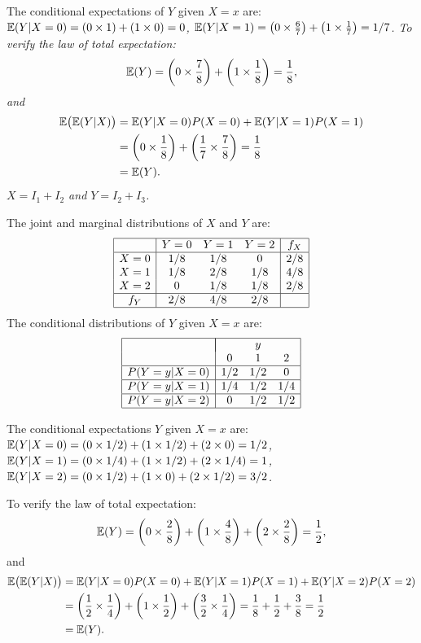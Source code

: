 \begin{exercise}
\begin{questions}
\begin{answer}
The conditional expectations of $Y$ given $X=x$ are:
\bit
\it $\mathbb{E}(Y|X=0) = \left(0\times 1\right) + \left(1\times 0\right) = 0$,
\it $\mathbb{E}(Y|X=1) = \left(0\times\frac{6}{7}\right) + \left(1\times\frac{1}{7}\right) = 1/7$.
\eit
To verify the law of total expectation:
\[
\mathbb{E}(Y) = \left(0\times\frac{7}{8}\right) + \left(1\times\frac{1}{8}\right) = \frac{1}{8},
\]
and
\begin{align*}
\mathbb{E}\big(\mathbb{E}(Y|X)\big)
	& = \mathbb{E}(Y|X=0)P(X=0)+\mathbb{E}(Y|X=1)P(X=1) \\
	& = \left(0\times \frac{1}{8}\right) + \left(\frac{1}{7}\times\frac{7}{8}\right) = \frac{1}{8} \\
	& = \mathbb{E}(Y).
\end{align*}
\it %
$X = I_1 + I_2$ and $Y = I_2 + I_3$.

The joint and marginal distributions of $X$ and $Y$ are:
\[
\begin{array}{|c|ccc|c|}\hline
	&	Y=0		& Y=1	& Y=2	& f_X \\ \hline
X=0	&	1/8		& 1/8	& 0		& 2/8 \\
X=1	&	1/8		& 2/8	& 1/8 	& 4/8 \\ 
X=2	&	  0		& 1/8 	& 1/8	& 2/8 \\ \hline
f_Y &	2/8		& 4/8	& 2/8	&	  \\ \hline
\end{array}
\]
The conditional distributions of $Y$ given $X=x$ are:
\[
\begin{array}{|c|ccc|}\hline
			&\multicolumn{3}{|c|}{y} 		\\
			&	0		& 1		& 2		\\ \hline
P(Y=y|X=0)	&	1/2		& 1/2 	& 0		\\ \hline
P(Y=y|X=1)	&	1/4		& 1/2 	& 1/4	\\ \hline
P(Y=y|X=2)	&	0		& 1/2 	& 1/2	\\ \hline
\end{array}
\]

The conditional expectations $Y$ given $X=x$ are:
\bit
\it $\mathbb{E}(Y|X=0) = (0\times 1/2)+(1\times 1/2)+(2\times   0) = 1/2$,
\it $\mathbb{E}(Y|X=1) = (0\times 1/4)+(1\times 1/2)+(2\times 1/4) = 1$,
\it $\mathbb{E}(Y|X=2) = (0\times 1/2)+(1\times 0)  +(2\times 1/2) = 3/2$.
\eit

To verify the law of total expectation:
\[
\mathbb{E}(Y) = \left(0\times\frac{2}{8}\right) + \left(1\times\frac{4}{8}\right) + \left(2\times\frac{2}{8}\right) = \frac{1}{2},
\]
and
\begin{align*}
\mathbb{E}\big(\mathbb{E}(Y|X)\big)
	& = \mathbb{E}(Y|X=0)P(X=0)+\mathbb{E}(Y|X=1)P(X=1)+\mathbb{E}(Y|X=2)P(X=2) \\
	& = \left(\frac{1}{2}\times\frac{1}{4}\right) + \left(1\times\frac{1}{2}\right) + \left(\frac{3}{2}\times\frac{1}{4}\right) 
	= \frac{1}{8} + \frac{1}{2} + \frac{3}{8}  = \frac{1}{2} \\
	& = \mathbb{E}(Y).
\end{align*}
\een
\end{answer}


\end{questions}
\end{exercise}
